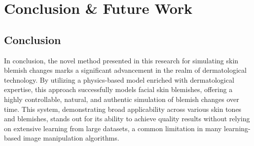 
\chapter{Conclusion \& Future Work}
\begin{spacing}{1.5}
\setlength{\parskip}{0.3in}



\section{Conclusion}
In conclusion, the novel method presented in this research for simulating skin blemish changes marks a significant advancement in the realm of dermatological technology. By utilizing a physics-based model enriched with dermatological expertise, this approach successfully models facial skin blemishes, offering a highly controllable, natural, and authentic simulation of blemish changes over time. This system, demonstrating broad applicability across various skin tones and blemishes, stands out for its ability to achieve quality results without relying on extensive learning from large datasets, a common limitation in many learning-based image manipulation algorithms.


\end{spacing}
